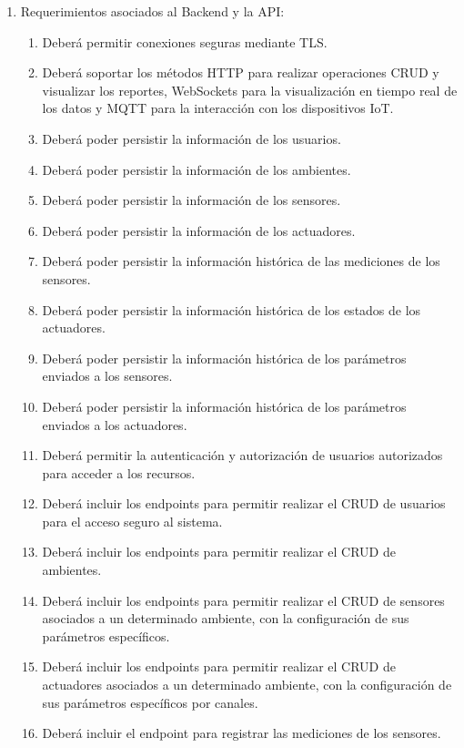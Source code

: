 \documentclass[
11pt, %
codirector, %
]{charter}
\begin{document}
\begin{enumerate}
	\item Requerimientos asociados al Backend y la API:
	      \begin{enumerate}
		      \item Deberá permitir conexiones seguras mediante TLS.
		      \item Deberá soportar los métodos HTTP para realizar operaciones CRUD y visualizar los reportes, WebSockets
		            para la visualización en tiempo real de los datos y MQTT para la interacción con
		            los dispositivos IoT.
			  \item Deberá poder persistir la información de los usuarios.
			  \item Deberá poder persistir la información de los ambientes.
			  \item Deberá poder persistir la información de los sensores.
			  \item Deberá poder persistir la información de los actuadores.
			  \item Deberá poder persistir la información histórica de las mediciones de los sensores.
			  \item Deberá poder persistir la información histórica de los estados de los actuadores.
			  \item Deberá poder persistir la información histórica de los parámetros enviados a los sensores.
			  \item Deberá poder persistir la información histórica de los parámetros enviados a los actuadores.
		      \item Deberá permitir la autenticación y autorización de usuarios autorizados para
		            acceder a los recursos.
		      \item Deberá incluir los endpoints para permitir realizar el CRUD de usuarios para el
		            acceso seguro al sistema.
		      \item Deberá incluir los endpoints para permitir realizar el CRUD de ambientes.
		      \item Deberá incluir los endpoints para permitir realizar el CRUD de sensores
		            asociados a un determinado ambiente, con la configuración de sus parámetros
		            específicos.
		      \item Deberá incluir los endpoints para permitir realizar el CRUD de actuadores
		            asociados a un determinado ambiente, con la configuración de sus parámetros
		            específicos por canales.
		      \item Deberá incluir el endpoint para registrar las mediciones de los sensores.

\end{enumerate}
\end{enumerate}
\end{document}
